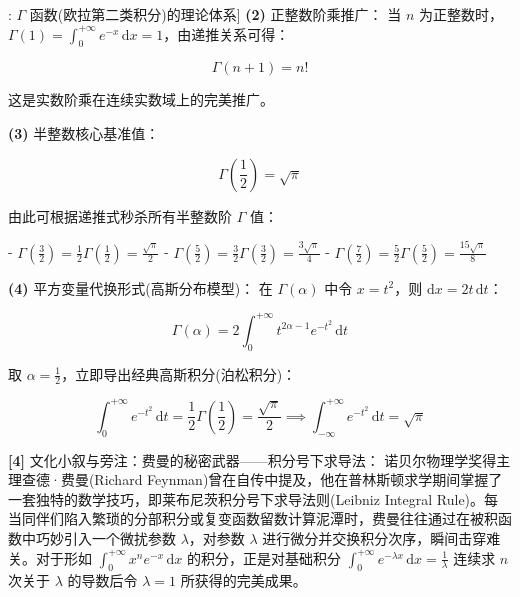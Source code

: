\documentclass[11pt,a4paper,UTF8]{ctexart}
\begin{document}
\begin{thmbox}[函数[1]: $\Gamma$ 函数(欧拉第二类积分)的理论体系]
\textbf{(2)}  正整数阶乘推广：
当 $n$ 为正整数时，$\Gamma(1) = \int_0^{+\infty} e^{-x}\,\mathrm{d}x = 1$，由递推关系可得：


\begin{equation*}
\Gamma(n+1) = n!
\end{equation*}


这是实数阶乘在连续实数域上的完美推广。

\textbf{(3)}  半整数核心基准值：

\begin{equation*}
\Gamma\left(\frac{1}{2}\right) = \sqrt{\pi}
\end{equation*}


由此可根据递推式秒杀所有半整数阶 $\Gamma$ 值：

- $\Gamma\left(\frac{3}{2}\right) = \frac{1}{2}\Gamma\left(\frac{1}{2}\right) = \frac{\sqrt{\pi}}{2}$
- $\Gamma\left(\frac{5}{2}\right) = \frac{3}{2}\Gamma\left(\frac{3}{2}\right) = \frac{3\sqrt{\pi}}{4}$
- $\Gamma\left(\frac{7}{2}\right) = \frac{5}{2}\Gamma\left(\frac{5}{2}\right) = \frac{15\sqrt{\pi}}{8}$

\textbf{(4)}  平方变量代换形式(高斯分布模型)：
在 $\Gamma(\alpha)$ 中令 $x = t^2$，则 $\mathrm{d}x = 2t\,\mathrm{d}t$：


\begin{equation*}
\Gamma(\alpha) = 2\int_0^{+\infty} t^{2\alpha-1}e^{-t^2}\,\mathrm{d}t
\end{equation*}


取 $\alpha = \frac{1}{2}$，立即导出经典高斯积分(泊松积分)：


\begin{equation*}
\int_0^{+\infty} e^{-t^2}\,\mathrm{d}t = \frac{1}{2}\Gamma\left(\frac{1}{2}\right) = \frac{\sqrt{\pi}}{2} \implies \int_{-\infty}^{+\infty} e^{-t^2}\,\mathrm{d}t = \sqrt{\pi}
\end{equation*}


\textbf{[4]} 文化小叙与旁注：费曼的秘密武器——积分号下求导法：
诺贝尔物理学奖得主理查德·费曼(Richard Feynman)曾在自传中提及，他在普林斯顿求学期间掌握了一套独特的数学技巧，即莱布尼茨积分号下求导法则(Leibniz Integral Rule)。每当同伴们陷入繁琐的分部积分或复变函数留数计算泥潭时，费曼往往通过在被积函数中巧妙引入一个微扰参数 $\lambda$，对参数 $\lambda$ 进行微分并交换积分次序，瞬间击穿难关。对于形如 $\int_0^{+\infty} x^n e^{-x}\,\mathrm{d}x$ 的积分，正是对基础积分 $\int_0^{+\infty} e^{-\lambda x}\,\mathrm{d}x = \frac{1}{\lambda}$ 连续求 $n$ 次关于 $\lambda$ 的导数后令 $\lambda=1$ 所获得的完美成果。
\end{thmbox}
\end{document}
